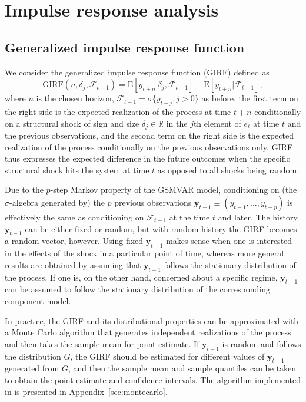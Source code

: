 \documentclass[nojss]{jss}
\begin{document}
\section{Impulse response analysis}\label{sec:impulseresponse}

\subsection{Generalized impulse response function}

We consider the generalized impulse response function (GIRF) \citep{Koop+Pesaran+Potter:1996} defined as
\begin{equation}\label{eq:girf}
\text{GIRF}(n,\delta_j,\mathcal{F}_{t-1}) = \text{E}[y_{t+n}|\delta_j,\mathcal{F}_{t-1}] - \text{E}[y_{t+n}|\mathcal{F}_{t-1}],
\end{equation}
where $n$ is the chosen horizon, $\mathcal{F}_{t-1}=\sigma\lbrace y_{t-j},j>0\rbrace$ as before, the first term on the right side is the expected realization of the process at time $t+n$ conditionally on a structural shock of sign and size $\delta_j \in\mathbb{R}$ in the $j$th element of $e_t$ at time $t$ and the previous observations, and the second term on the right side is the expected realization of the process conditionally on the previous observations only. GIRF thus expresses the expected difference in the future outcomes when the specific structural shock hits the system at time $t$ as opposed to all shocks being random.

Due to the $p$-step Markov property of the GSMVAR model, conditioning on (the $\sigma$-algebra generated by) the $p$ previous observations $\boldsymbol{y}_{t-1}\equiv(y_{t-1},...,y_{t-p})$ is effectively the same as conditioning on $\mathcal{F}_{t-1}$ at the time $t$ and later. The history $\boldsymbol{y}_{t-1}$ can be either fixed or random, but with random history the GIRF becomes a random vector, however. Using fixed $\boldsymbol{y}_{t-1}$ makes sense when one is interested in the effects of the shock in a particular point of time, whereas more general results are obtained by assuming that $\boldsymbol{y}_{t-1}$ follows the stationary distribution of the process. If one is, on the other hand, concerned about a specific regime, $\boldsymbol{y}_{t-1}$ can be assumed to follow the stationary distribution of the corresponding component model.

In practice, the GIRF and its distributional properties can be approximated with a Monte Carlo algorithm that generates independent realizations of the process and then takes the sample mean for point estimate. If $\boldsymbol{y}_{t-1}$ is random and follows the distribution $G$, the GIRF should be estimated for different values of $\boldsymbol{y}_{t-1}$ generated from $G$, and then the sample mean and sample quantiles can be taken to obtain the point estimate and confidence intervals. The algorithm implemented in  is presented in Appendix~\ref{sec:montecarlo}.
\end{document}
